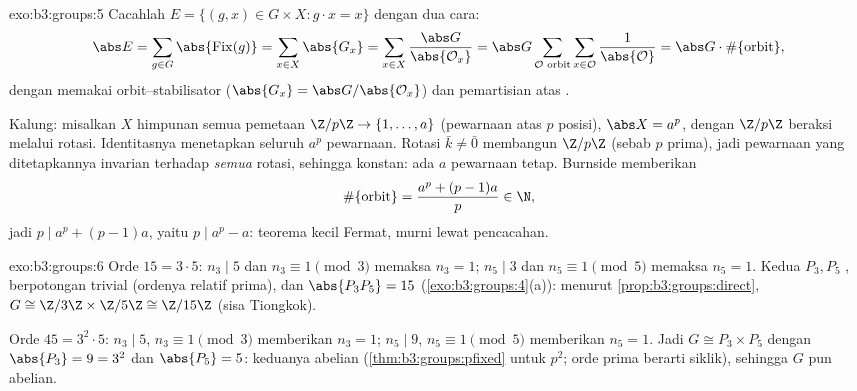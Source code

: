 \begin{solution}{exo:b3:groups:5}
Cacahlah $E = \{(g,x) \in G \times X : g \cdot x = x\}$ dengan dua cara:
\[
\abs E = \sum_{g \in G} \abs{\operatorname{Fix}(g)}
= \sum_{x \in X} \abs{G_x}
= \sum_{x \in X} \frac{\abs G}{\abs{\mathcal O_x}}
= \abs G \sum_{\mathcal O \text{ orbit}} \sum_{x \in \mathcal O}
\frac{1}{\abs{\mathcal O}}
= \abs G \cdot \#\{\text{orbit}\},
\]
dengan memakai orbit--stabilisator ($\abs{G_x} = \abs G/\abs{\mathcal O_x}$)
dan pemartisian atas .

Kalung: misalkan $X$ himpunan semua pemetaan $\Z/p\Z \to
\{1, \dots, a\}$ (pewarnaan atas $p$ posisi), $\abs X = a^p$,
dengan $\Z/p\Z$ beraksi melalui rotasi. Identitasnya menetapkan seluruh $a^p$
pewarnaan. Rotasi $\bar k \neq \bar 0$ membangun $\Z/p\Z$ (sebab $p$
prima), jadi pewarnaan yang ditetapkannya invarian terhadap \emph{semua}
rotasi, sehingga konstan: ada $a$ pewarnaan tetap. Burnside memberikan
\[
\#\{\text{orbit}\} = \frac{a^p + (p-1)a}{p} \in \N ,
\]
jadi $p \mid a^p + (p-1)a$, yaitu $p \mid a^p - a$: teorema kecil
Fermat, murni lewat pencacahan.
\end{solution}

\begin{solution}{exo:b3:groups:6}
Orde $15 = 3 \cdot 5$: $n_3 \mid 5$ dan $n_3 \equiv 1 \pmod 3$
memaksa $n_3 = 1$; $n_5 \mid 3$ dan $n_5 \equiv 1 \pmod 5$ memaksa
$n_5 = 1$. Kedua  $P_3, P_5$ , berpotongan trivial
(ordenya relatif prima), dan $\abs{P_3P_5} = 15$
(\cref{exo:b3:groups:4}(a)): menurut \cref{prop:b3:groups:direct}, $G
\cong \Z/3\Z \times \Z/5\Z \cong \Z/15\Z$ (sisa Tiongkok).

Orde $45 = 3^2 \cdot 5$: $n_3 \mid 5$, $n_3 \equiv 1 \pmod 3$
memberikan $n_3 = 1$; $n_5 \mid 9$, $n_5 \equiv 1 \pmod 5$ memberikan $n_5 =
1$. Jadi $G \cong P_3 \times P_5$ dengan $\abs{P_3} = 9 = 3^2$ dan
$\abs{P_5} = 5$: keduanya abelian (\cref{thm:b3:groups:pfixed} untuk
$p^2$; orde prima berarti siklik), sehingga $G$ pun abelian.
\end{solution}

